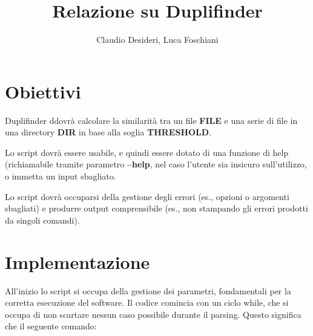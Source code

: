 \documentclass[a4paper,10pt]{article}
\title{Relazione su Duplifinder}
\author{Claudio Desideri, Luca Foschiani}
\begin{document}
\maketitle


\section{Obiettivi}
Duplifinder ddovrà calcolare la similarità tra un file \textbf{FILE} e una serie di file in una directory \textbf{DIR}
 in base alla soglia \textbf{THRESHOLD}.

Lo script dovrà essere usabile, e quindi essere dotato di una funzione di help (richiamabile tramite parametro \textbf{--help}, nel caso l'utente sia insicuro sull'utilizzo,
 o immetta un input sbagliato.

Lo script dovrà occuparsi della gestione degli errori (es., opzioni o argomenti sbagliati)
 e produrre output comprensibile (es., non stampando gli errori prodotti da singoli comandi).

\section{Implementazione}
All'inizio lo script si occupa della gestione dei parametri, fondamentali per la corretta esecuzione del software.
Il codice comincia con un ciclo while, che si occupa di non scartare nessun caso possibile durante il parsing.
Questo significa che il seguente comando:
\end{document}
